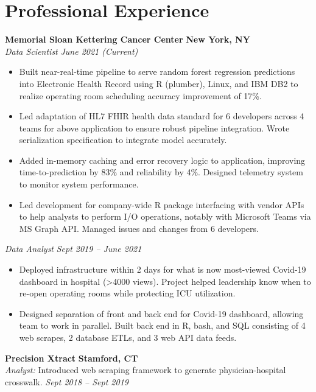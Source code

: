 \documentclass[11pt]{article}
\newcommand{\bfentry}[2]{\vspace{1mm}\textbf{#1} \hfill \textbf{#2}}
\newcommand{\itentry}[2]{\vspace{0.5mm}\textit{#1} \hfill \textit{#2}}
\begin{document}
\section{Professional Experience}
\bfentry{Memorial Sloan Kettering Cancer Center}{New York, NY} \\
\itentry{Data Scientist}{June 2021 (Current)}
\begin{itemize}
    \item Built near-real-time pipeline to serve random forest regression predictions into Electronic Health Record using R (plumber), Linux, and IBM DB2 to realize operating room scheduling accuracy improvement of 17\%.
    \item Led adaptation of HL7 FHIR health data standard for 6 developers across 4 teams for above application to ensure robust pipeline integration. Wrote serialization specification to integrate model accurately.
    \item Added in-memory caching and error recovery logic to application, improving time-to-prediction by 83\% and reliability by 4\%. Designed telemetry system to monitor system performance.
    \item Led development for company-wide R package interfacing with vendor APIs to help analysts to perform I/O operations, notably with Microsoft Teams via MS Graph API. Managed issues and changes from 6 developers.
\end{itemize}
\itentry{Data Analyst}{Sept 2019 -- June 2021}
\begin{itemize}
    \item Deployed infrastructure within 2 days for what is now most-viewed Covid-19 dashboard in hospital (>4000 views). Project helped leadership know when to re-open operating rooms while protecting ICU utilization.
    \item Designed separation of front and back end for Covid-19 dashboard, allowing team to work in parallel. Built back end in R, bash, and SQL consisting of 4 web scrapes, 2 database ETLs, and 3 web API data feeds.
\end{itemize}
\vspace{1mm}
\bfentry{Precision Xtract}{Stamford, CT} \\
\vspace{0.5mm}\textit{Analyst:} Introduced web scraping framework to generate physician-hospital crosswalk. \hfill \textit{Sept 2018 -- Sept 2019}
\end{document}
